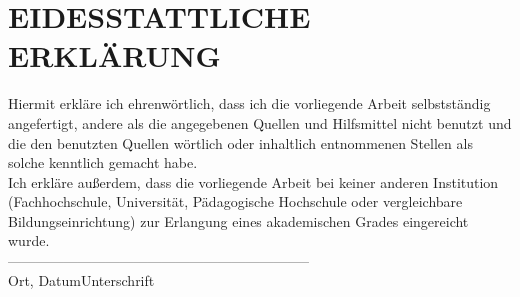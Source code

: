 \newpage
\section*{EIDESSTATTLICHE ERKLÄRUNG}
\vspace{3cm}
Hiermit erkläre ich ehrenwörtlich, dass ich die vorliegende Arbeit selbstständig angefertigt, andere als die angegebenen Quellen und Hilfsmittel nicht benutzt und die den benutzten Quellen wörtlich oder inhaltlich entnommenen Stellen als solche kenntlich gemacht habe. \\

\noindent Ich erkläre außerdem, dass die vorliegende Arbeit bei keiner anderen Institution (Fachhochschule, Universität, Pädagogische Hochschule oder vergleichbare Bildungseinrichtung) zur Erlangung eines akademischen Grades eingereicht wurde.
\vspace{5cm}
\\
---------------------------------------\hspace*{4cm}--------------------------
\\\hspace*{1.5cm}Ort, Datum\hspace*{6.15cm}Unterschrift
